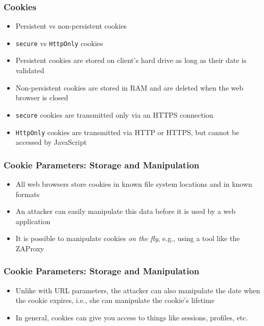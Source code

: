 \begin{frame}[fragile]
    \frametitle{Cookies}
    \begin{itemize}
        \item Persistent vs non-persistent cookies
        \item \verb|secure| vs \verb|HttpOnly| cookies
        \item Persistent cookies are stored on client's hard drive as long as their date is validated
        \item Non-persistent cookies are stored in RAM and are deleted when the web browser is closed
        \item \verb|secure| cookies are transmitted only via an HTTPS connection
        \item \verb|HttpOnly| cookies are transmitted via HTTP or HTTPS, but cannot be accessed by JavaScript
    \end{itemize}
\end{frame}

\begin{frame}
    \frametitle{Cookie Parameters: Storage and Manipulation}
    \begin{itemize}
        \item All web browsers store cookies in known file system locations and in known formats
        \item An attacker can easily manipulate this data before it is used by a web application
        \item It is possible to manipulate cookies \textit{on the fly}, e.g., using a tool like the ZAProxy
    \end{itemize}
\end{frame}

\begin{frame}
    \frametitle{Cookie Parameters: Storage and Manipulation}
    \begin{itemize}
        \item Unlike with URL parameters, the attacker can also manipulate the date when the cookie expires, i.e., she can manipulate the cookie's lifetime
        \item In general, cookies can give you access to things like sessions, profiles, etc.
    \end{itemize}
\end{frame}

